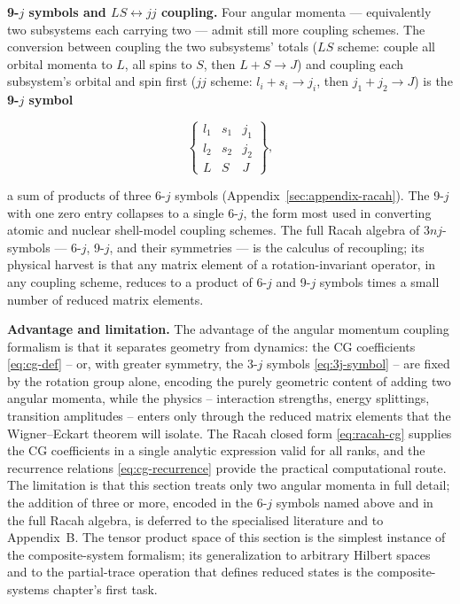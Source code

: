 \medskip\noindent\textbf{9-$j$ symbols and $LS\leftrightarrow jj$ coupling.} Four angular momenta --- equivalently two subsystems each carrying two --- admit still more coupling schemes. The conversion between coupling the two subsystems' totals ($LS$ scheme: couple all orbital momenta to $L$, all spins to $S$, then $L+S\to J$) and coupling each subsystem's orbital and spin first ($jj$ scheme: $l_{i}+s_{i}\to j_{i}$, then $j_{1}+j_{2}\to J$) is the \textbf{9-$j$ symbol}
\begin{linenomath}
  \begin{equation*}
    \begin{Bmatrix}l_{1}&s_{1}&j_{1}\\ l_{2}&s_{2}&j_{2}\\ L&S&J\end{Bmatrix},
  \end{equation*}
\end{linenomath}
a sum of products of three 6-$j$ symbols (Appendix~\ref{sec:appendix-racah}). The 9-$j$ with one zero entry collapses to a single 6-$j$, the form most used in converting atomic and nuclear shell-model coupling schemes. The full Racah algebra of $3nj$-symbols --- 6-$j$, 9-$j$, and their symmetries --- is the calculus of recoupling; its physical harvest is that any matrix element of a rotation-invariant operator, in any coupling scheme, reduces to a product of 6-$j$ and 9-$j$ symbols times a small number of reduced matrix elements.

\medskip\noindent\textbf{Advantage and limitation.}
The advantage of the angular momentum coupling formalism is that it separates geometry from dynamics: the CG coefficients \eqref{eq:cg-def} -- or, with greater symmetry, the 3-$j$ symbols \eqref{eq:3j-symbol} -- are fixed by the rotation group alone, encoding the purely geometric content of adding two angular momenta, while the physics -- interaction strengths, energy splittings, transition amplitudes -- enters only through the reduced matrix elements that the Wigner--Eckart theorem will isolate. The Racah closed form \eqref{eq:racah-cg} supplies the CG coefficients in a single analytic expression valid for all ranks, and the recurrence relations \eqref{eq:cg-recurrence} provide the practical computational route. The limitation is that this section treats only two angular momenta in full detail; the addition of three or more, encoded in the 6-$j$ symbols named above and in the full Racah algebra, is deferred to the specialised literature and to Appendix~B. The tensor product space of this section is the simplest instance of the composite-system formalism; its generalization to arbitrary Hilbert spaces and to the partial-trace operation that defines reduced states is the composite-systems chapter's first task.

